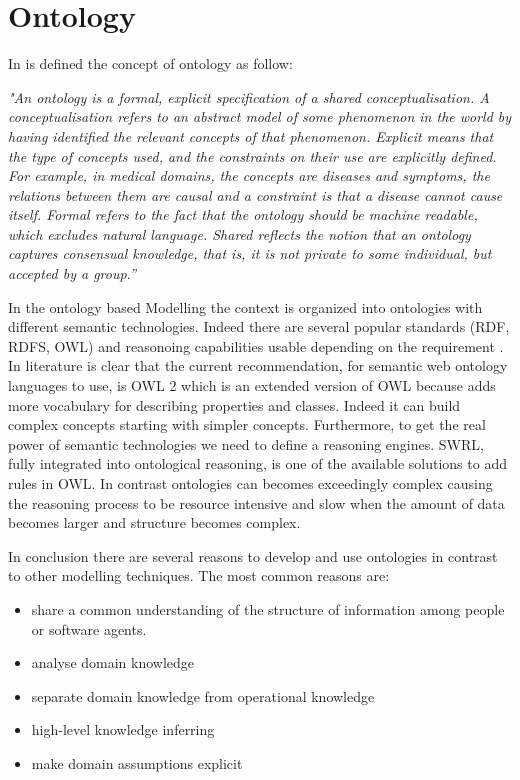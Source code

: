 \documentclass{thesisreport}
\begin{document}
\section{Ontology} \label{ontology}

In \cite{studer1998knowledge} is defined the concept of ontology as follow: 
\begin{center}
\textit{"An ontology is a formal, explicit specification of a shared conceptualisation. A conceptualisation refers to an abstract model of some phenomenon in the world by having identified the relevant concepts of that phenomenon. Explicit means that the type of concepts used, and the constraints on their use are explicitly defined. For example, in medical domains, the concepts are diseases and symptoms, the relations between them are causal and a constraint is that a disease cannot cause itself. Formal refers to the fact that the ontology should be machine readable, which excludes natural language. Shared reflects the notion that an ontology captures consensual knowledge, that is, it is not private to some individual, but accepted by a group.”}
\end{center}


In the ontology based Modelling the context is organized into ontologies with different semantic technologies. Indeed there are several popular standards (RDF, RDFS, OWL) and reasonoing capabilities usable depending on the requirement \cite{perera2014context}. 
In literature is clear that the current recommendation, for semantic web ontology languages to use, is OWL 2 which is an extended version of OWL \cite{perera2014context} because adds more vocabulary for describing properties and classes. Indeed it can build complex concepts starting with simpler concepts.
Furthermore, to get the real power of semantic technologies we need to define a  reasoning engines. 
SWRL, fully integrated into ontological reasoning, is one of the available solutions to add rules in OWL. In contrast ontologies can becomes exceedingly complex causing the reasoning process to be resource intensive and slow when the amount of data becomes larger and structure becomes complex. 

In conclusion there are several reasons to develop and use ontologies in contrast to other modelling techniques. The most common reasons are:
\begin{itemize}
    \item share a common understanding of the structure of information among people or software agents.
    \item analyse domain knowledge
    \item separate domain knowledge from operational knowledge
    \item high-level knowledge inferring
    \item make domain assumptions explicit
\end{itemize}
\end{document}
